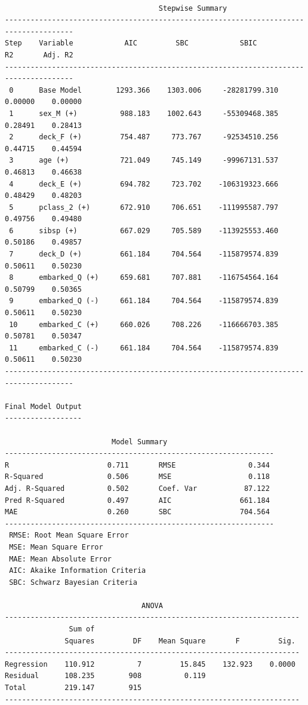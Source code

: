 \documentclass[
  letterpaper,
  DIV=11,
  numbers=noendperiod]{scrartcl}
\begin{document}
\begin{verbatim}

                                    Stepwise Summary                                    
--------------------------------------------------------------------------------------
Step    Variable            AIC         SBC            SBIC           R2       Adj. R2 
--------------------------------------------------------------------------------------
 0      Base Model        1293.366    1303.006     -28281799.310    0.00000    0.00000 
 1      sex_M (+)          988.183    1002.643     -55309468.385    0.28491    0.28413 
 2      deck_F (+)         754.487     773.767     -92534510.256    0.44715    0.44594 
 3      age (+)            721.049     745.149     -99967131.537    0.46813    0.46638 
 4      deck_E (+)         694.782     723.702    -106319323.666    0.48429    0.48203 
 5      pclass_2 (+)       672.910     706.651    -111995587.797    0.49756    0.49480 
 6      sibsp (+)          667.029     705.589    -113925553.460    0.50186    0.49857 
 7      deck_D (+)         661.184     704.564    -115879574.839    0.50611    0.50230 
 8      embarked_Q (+)     659.681     707.881    -116754564.164    0.50799    0.50365 
 9      embarked_Q (-)     661.184     704.564    -115879574.839    0.50611    0.50230 
 10     embarked_C (+)     660.026     708.226    -116666703.385    0.50781    0.50347 
 11     embarked_C (-)     661.184     704.564    -115879574.839    0.50611    0.50230 
--------------------------------------------------------------------------------------

Final Model Output 
------------------

                         Model Summary                          
---------------------------------------------------------------
R                       0.711       RMSE                 0.344 
R-Squared               0.506       MSE                  0.118 
Adj. R-Squared          0.502       Coef. Var           87.122 
Pred R-Squared          0.497       AIC                661.184 
MAE                     0.260       SBC                704.564 
---------------------------------------------------------------
 RMSE: Root Mean Square Error 
 MSE: Mean Square Error 
 MAE: Mean Absolute Error 
 AIC: Akaike Information Criteria 
 SBC: Schwarz Bayesian Criteria 

                                ANOVA                                 
---------------------------------------------------------------------
               Sum of                                                
              Squares         DF    Mean Square       F         Sig. 
---------------------------------------------------------------------
Regression    110.912          7         15.845    132.923    0.0000 
Residual      108.235        908          0.119                      
Total         219.147        915                                     
---------------------------------------------------------------------


\end{verbatim}
\end{document}
